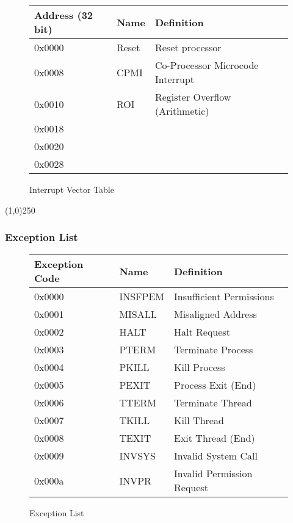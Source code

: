 \documentclass[letterpaper, 11pt]{article}
\begin{document}
\begin{figure}[!h]
	\begin{center}
		\begin{tabular}{|l|l|l|}
			\hline
			Address (32 bit) 	& Name  & Definition						\\  \hline
			0x0000 				& Reset & Reset processor					\\ 	\hline
			0x0008 				& CPMI  & Co-Processor Microcode Interrupt 	\\ 	\hline
			0x0010 				& ROI	& Register Overflow (Arithmetic)	\\ 	\hline
			0x0018				&  \\ 	\hline
			0x0020 				&  \\ 	\hline
			0x0028 				&  \\	\hline
		\end{tabular} 
		\caption{Interrupt Vector Table}
	\end{center}
	
\end{figure} 

\begin{center}
	\line(1,0){250}
\end{center}

\subsubsection{Exception List}

\begin{figure}[!h]
	\begin{center}
		\begin{tabular}{|l|l|l|}
			\hline
			Exception Code 		& Name		& Definition						\\ \hline
			0x0000 				& INSFPEM	& Insufficient Permissions 			\\ \hline
			0x0001 				& MISALL	& Misaligned Address	 			\\ \hline
			0x0002 				& HALT		& Halt Request			 			\\ \hline
			0x0003 				& PTERM		& Terminate Process		 			\\ \hline
			0x0004 				& PKILL		& Kill Process			 			\\ \hline
			0x0005				& PEXIT		& Process Exit (End)				\\ \hline
			0x0006				& TTERM		& Terminate Thread					\\ \hline
			0x0007				& TKILL		& Kill Thread						\\ \hline
			0x0008				& TEXIT		& Exit Thread (End)					\\ \hline
			0x0009				& INVSYS	& Invalid System Call				\\ \hline
			0x000a				& INVPR		& Invalid Permission Request		\\ \hline
		\end{tabular} 
		\caption{Exception List}
	\end{center}
	
\end{figure} 
\end{document}
